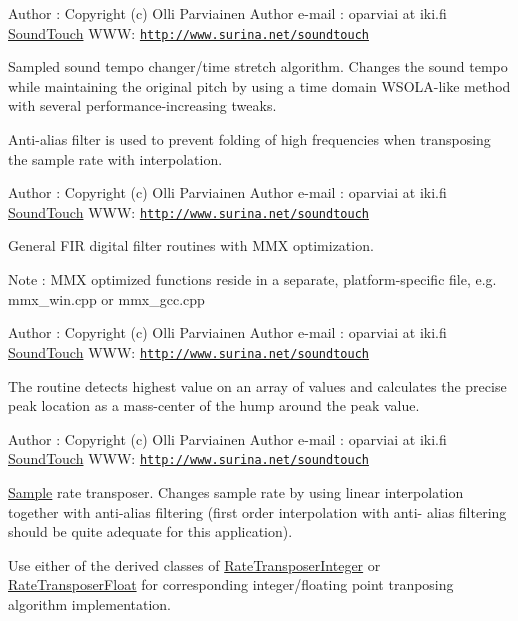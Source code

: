 Author \+: Copyright (c) Olli Parviainen Author e-\/mail \+: oparviai \textquotesingle{}at\textquotesingle{} iki.\+fi \hyperlink{classsoundtouch_1_1_sound_touch}{Sound\+Touch} W\+WW\+: \href{http://www.surina.net/soundtouch}{\tt http\+://www.\+surina.\+net/soundtouch}

Sampled sound tempo changer/time stretch algorithm. Changes the sound tempo while maintaining the original pitch by using a time domain W\+S\+O\+L\+A-\/like method with several performance-\/increasing tweaks.

Anti-\/alias filter is used to prevent folding of high frequencies when transposing the sample rate with interpolation.

Author \+: Copyright (c) Olli Parviainen Author e-\/mail \+: oparviai \textquotesingle{}at\textquotesingle{} iki.\+fi \hyperlink{classsoundtouch_1_1_sound_touch}{Sound\+Touch} W\+WW\+: \href{http://www.surina.net/soundtouch}{\tt http\+://www.\+surina.\+net/soundtouch}

General F\+IR digital filter routines with M\+MX optimization.

Note \+: M\+MX optimized functions reside in a separate, platform-\/specific file, e.\+g. \textquotesingle{}mmx\+\_\+win.\+cpp\textquotesingle{} or \textquotesingle{}mmx\+\_\+gcc.\+cpp\textquotesingle{}

Author \+: Copyright (c) Olli Parviainen Author e-\/mail \+: oparviai \textquotesingle{}at\textquotesingle{} iki.\+fi \hyperlink{classsoundtouch_1_1_sound_touch}{Sound\+Touch} W\+WW\+: \href{http://www.surina.net/soundtouch}{\tt http\+://www.\+surina.\+net/soundtouch}

The routine detects highest value on an array of values and calculates the precise peak location as a mass-\/center of the \textquotesingle{}hump\textquotesingle{} around the peak value.

Author \+: Copyright (c) Olli Parviainen Author e-\/mail \+: oparviai \textquotesingle{}at\textquotesingle{} iki.\+fi \hyperlink{classsoundtouch_1_1_sound_touch}{Sound\+Touch} W\+WW\+: \href{http://www.surina.net/soundtouch}{\tt http\+://www.\+surina.\+net/soundtouch}

\hyperlink{struct_sample}{Sample} rate transposer. Changes sample rate by using linear interpolation together with anti-\/alias filtering (first order interpolation with anti-\/ alias filtering should be quite adequate for this application).

Use either of the derived classes of \textquotesingle{}\hyperlink{class_rate_transposer_integer}{Rate\+Transposer\+Integer}\textquotesingle{} or \textquotesingle{}\hyperlink{class_rate_transposer_float}{Rate\+Transposer\+Float}\textquotesingle{} for corresponding integer/floating point tranposing algorithm implementation.

